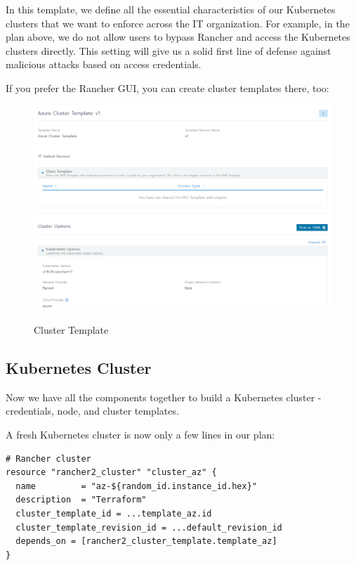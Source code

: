 In this template, we define all the essential characteristics of our Kubernetes clusters that we want to enforce across the IT organization. For example, in the plan above, we do not allow users to bypass Rancher and access the Kubernetes clusters directly. This setting will give us a solid first line of defense against malicious attacks based on access credentials.

If you prefer the Rancher GUI, you can create cluster templates there, too:

\begin{figure}[H]
\centering
\caption {Cluster Template}
\includegraphics[width=\linewidth]{images/cluster-template.png}
\label{fig:clusterTemplate}
\end{figure}

\subsection{Kubernetes Cluster}

Now we have all the components together to build a Kubernetes cluster - credentials, node, and cluster templates. 

A fresh Kubernetes cluster is now only a few lines in our plan:

\begin{lstlisting}[caption=Kubernetes Cluster, frame=single, basicstyle=\ttfamily]
# Rancher cluster
resource "rancher2_cluster" "cluster_az" {
  name         = "az-${random_id.instance_id.hex}"
  description  = "Terraform"
  cluster_template_id = ...template_az.id
  cluster_template_revision_id = ...default_revision_id
  depends_on = [rancher2_cluster_template.template_az]
}
\end{lstlisting}


